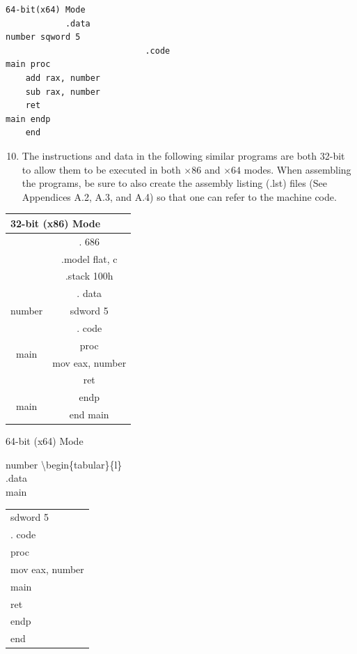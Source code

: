 \documentclass[10pt]{book}
\begin{document}
\begin{verbatim}
64-bit(x64) Mode
            .data
number sqword 5
                            .code
main proc
    add rax, number
    sub rax, number
    ret
main endp
    end
\end{verbatim}

\begin{enumerate}
  \setcounter{enumi}{9}
  \item The instructions and data in the following similar programs are both 32-bit to allow them to be executed in both $\times 86$ and $\times 64$ modes. When assembling the programs, be sure to also create the assembly listing (.lst) files (See Appendices A.2, A.3, and A.4) so that one can refer to the machine code.
\end{enumerate}


\begin{center}
\begin{tabular}{|c|c|}
\hline
\multicolumn{2}{|l|}{32-bit (x86) Mode} \\
\hline
 & . 686 \\
\hline
 & .model flat, c \\
\hline
 & .stack 100h \\
\hline
 & . data \\
\hline
number & sdword 5 \\
\hline
 & . code \\
\hline
\multirow[t]{2}{*}{main} & proc \\
\hline
 & mov eax, number \\
\hline
 & ret \\
\hline
\multirow[t]{2}{*}{main} & endp \\
\hline
 & end main \\
\hline
\end{tabular}
\end{center}

64-bit (x64) Mode

number \textbackslash begin\{tabular\}\{l\}\\
.data \\


main \begin{tabular}{l}
sdword 5 \\
. code \\
proc \\
mov eax, number \\
main \\
ret \\
endp \\
end \\
\end{tabular}
\end{document}
